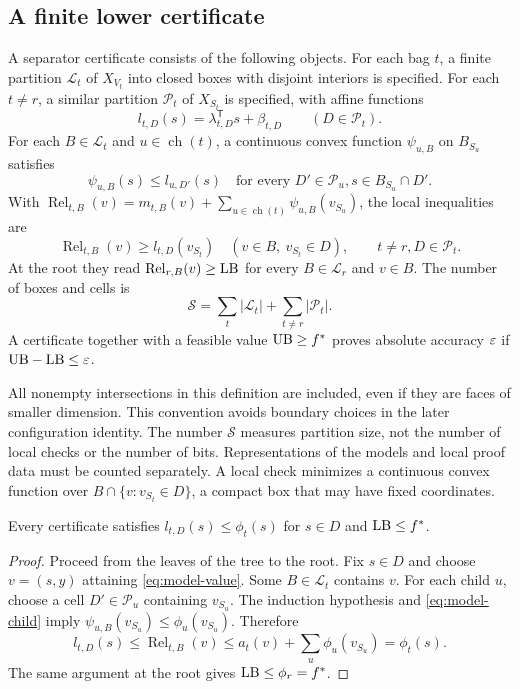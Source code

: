 \subsection{A finite lower certificate}
\begin{definition}\label{def:model-certificate}
A separator certificate consists of the following objects.
For each bag $t$, a finite partition $\mathcal L_t$ of $X_{V_t}$ into
closed boxes with disjoint interiors is specified. For each $t\ne r$,
a similar partition $\mathcal P_t$ of $X_{S_t}$ is specified, with affine
functions
\[
 l_{t,D}(s)=\lambda_{t,D}^{\mathsf T}s+\beta_{t,D}
 \qquad(D\in\mathcal P_t).
\]
For each $B\in\mathcal L_t$ and $u\in\operatorname{ch}(t)$, a continuous
convex function $\psi_{u,B}$ on $B_{S_u}$ satisfies
\begin{equation}\label{eq:model-child}
 \psi_{u,B}(s)\le l_{u,D'}(s)
 \quad\text{for every }D'\in\mathcal P_u, s\in B_{S_u}\cap D'.
\end{equation}
With $\operatorname{Rel}_{t,B}(v)=m_{t,B}(v)+
\sum_{u\in\operatorname{ch}(t)}\psi_{u,B}(v_{S_u})$, the local inequalities are
\begin{equation}\label{eq:model-local}
 \operatorname{Rel}_{t,B}(v)\ge l_{t,D}(v_{S_t})
 \quad(v\in B,\ v_{S_t}\in D),\qquad t\ne r, D\in\mathcal P_t.
\end{equation}
At the root they read $\operatorname{Rel}_{r,B}(v)\ge\mathrm{LB}$ for every
$B\in\mathcal L_r$ and $v\in B$.
The number of boxes and cells is
\[
 \mathcal S=\sum_t|\mathcal L_t|+\sum_{t\ne r}|\mathcal P_t|.
\]
A certificate together with a feasible value $\mathrm{UB}\ge f^*$ proves absolute
accuracy $\varepsilon$ if $\mathrm{UB}-\mathrm{LB}\le\varepsilon$.
\end{definition}

All nonempty intersections in this definition are included, even if they
are faces of smaller dimension. This convention avoids boundary choices
in the later configuration identity. The number $\mathcal S$ measures
partition size, not the number of local checks or the number of bits.
Representations of the models and local proof data must be counted
separately. A local check minimizes a continuous convex function over
$B\cap\{v:v_{S_t}\in D\}$, a compact box that may have fixed coordinates.

\begin{proposition}[Validity]\label{prop:model-validity}
Every certificate satisfies $l_{t,D}(s)\le\phi_t(s)$ for $s\in D$ and
$\mathrm{LB}\le f^*$.
\end{proposition}
\begin{proof}
Proceed from the leaves of the tree to the root. Fix $s\in D$ and choose
$v=(s,y)$ attaining \eqref{eq:model-value}. Some $B\in\mathcal L_t$
contains $v$. For each child $u$, choose a cell $D'\in\mathcal P_u$
containing $v_{S_u}$. The induction hypothesis and
\eqref{eq:model-child} imply
$\psi_{u,B}(v_{S_u})\le\phi_u(v_{S_u})$. Therefore
\[
 l_{t,D}(s)\le\operatorname{Rel}_{t,B}(v)
 \le a_t(v)+\sum_u\phi_u(v_{S_u})=\phi_t(s).
\]
The same argument at the root gives $\mathrm{LB}\le\phi_r=f^*$.
\end{proof}

